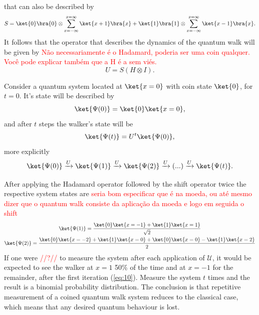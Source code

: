     	        that can also be described by
    	        \begin{equation}
    	            S = \ket{0}\bra{0} \otimes \sum_{x=-\infty}^{x=\infty} \ket{x+1}\bra{x} + \ket{1}\bra{1}\otimes \sum_{x=-\infty}^{x=\infty} \ket{x-1}\bra{x}.
    	        \end{equation}
    	        It follows that the operator that describes the dynamics of the quantum walk will be given by \textcolor{red}{Não necessariamente é o Hadamard, poderia ser uma coin qualquer. Você pode explicar também que a H é a sem viés.}
    	        \begin{equation}
    	            U = S(H\otimes I). \label{coinedUnmarkedOperator}
    	        \end{equation}\par
    	        Consider a quantum system located at $\ket{x = 0}$ with coin state $\ket{0}$, for $t=0$. It's state will be described by
    	        \begin{equation}
    	            \ket{\Psi(0)} = \ket{0}\ket{x=0},
    	            \label{eq:7}
    	        \end{equation}
    	        and after $t$ steps the walker's state will be
    	        \begin{equation}
    	            \ket{\Psi(t)}=U^{t}\ket{\Psi(0)},
    	        \end{equation}
    	        more explicitly
    	        \begin{equation}
    	            \ket{\Psi(0)}\xrightarrow[]{\text{$U$}}\ket{\Psi(1)}\xrightarrow[]{\text{$U$}}\ket{\Psi(2)}\xrightarrow[]{\text{$U$}} (...) \xrightarrow[]{\text{$U$}}\ket{\Psi(t)}.
    	        \end{equation}\par
    	        After applying the Hadamard operator followed by the shift operator twice the respective system states are \textcolor{red}{seria bom especificar que é na moeda, ou até mesmo dizer que o quantum walk consiste da aplicação da moeda e logo em seguida o shift}
    	        \begin{gather}
    	            \ket{\Psi(1)} = \frac{\ket{0}\ket{x=-1}+\ket{1}\ket{x=1}}{\sqrt{2}}\label{eq:10}\\
    	            \ket{\Psi(2)} = \frac{\ket{0}\ket{x=-2}+\ket{1}\ket{x=0}+\ket{0}\ket{x=0}-\ket{1}\ket{x=2}}{2}\label{eq:11}\\
    	        \end{gather}
                 If one were \textcolor{red}{//?//} to measure the system after each application of $\mathcal{U}$, it would be expected to see the walker at $x=1$ 50\% of the time and at $x=-1$ for the remainder, after the first iteration (\ref{eq:10}). Measure the system $t$ times and the result is a binomial probability distribution. The conclusion is that repetitive measurement of a coined quantum walk system reduces to the classical case, which means that any desired quantum behaviour is lost. \par
